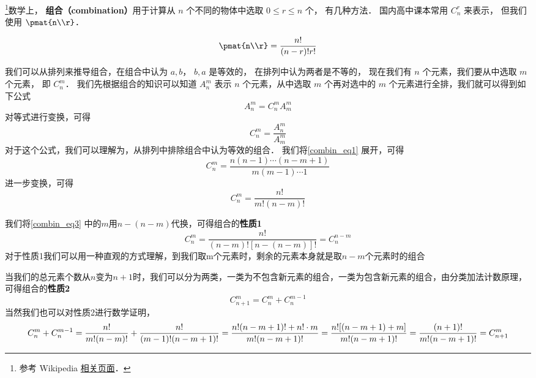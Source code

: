 
\begin{issues}
\issueDraft
\end{issues}


\footnote{参考 Wikipedia \href{https://en.wikipedia.org/wiki/Combination}{相关页面}．}数学上， \textbf{组合（combination）}用于计算从 $n$ 个不同的物体中选取 $0 \leqslant r \leqslant n$ 个， 有几种方法． 国内高中课本常用 $C_n^r$ 来表示， 但我们使用 $\pmat{n\\r}$．

\begin{equation}
\pmat{n\\r} = \frac{n!}{(n-r)!r!}
\end{equation}

我们可以从排列来推导组合，在组合中认为 ${a,b}$， ${b,a}$ 是等效的， 在排列中认为两者是不等的， 现在我们有 $n$ 个元素，我们要从中选取 $m$ 个元素， 即 $C_n^m$．
我们先根据组合的知识可以知道 $A_n^m$ 表示 $n$ 个元素，从中选取 $m$ 个再对选中的 $m$ 个元素进行全排，我们就可以得到如下公式
\begin{equation}
A_n^m = C_n^m A_m^m
\end{equation}
对等式进行变换，可得
\begin{equation}\label{combin_eq1}
C_n^m = \frac{A_n^m}{A_m^m}
\end{equation}
对于这个公式，我们可以理解为，从排列中排除组合中认为等效的组合．
我们将\autoref{combin_eq1} 展开，可得
\begin{equation}\label{combin_eq2}
C_n^m = \frac{n(n - 1) \cdots (n - m + 1)}{m(m-1)\cdots 1}
\end{equation}
进一步变换，可得
\begin{equation}\label{combin_eq3}
C_n^m = \frac{n!}{m!(n-m)!}
\end{equation}

我们将\autoref{combin_eq3} 中的$m$用$n-(n-m)$代换，可得组合的\textbf{性质1}
\begin{equation}
C_n^m = \frac{n!}{(n-m)![n-(n-m)]!} = C_n^{n-m}
\end{equation}
对于性质1我们可以用一种直观的方式理解，到我们取m个元素时，剩余的元素本身就是取$n-m$个元素时的组合

当我们的总元素个数从$n$变为$n+1$时，我们可以分为两类，一类为不包含新元素的组合，一类为包含新元素的组合，由分类加法计数原理，可得组合的\textbf{性质2}
\begin{equation}
C_{n + 1}^m = C_n^m + C_n^{m - 1}
\end{equation}
当然我们也可以对性质2进行数学证明，
\begin{equation}
C_n^m + C_n^{m - 1} = \frac{n!}{m!(n-m)!} + \frac{n!}{(m - 1)!(n - m + 1)!}\\
=\frac{n!(n - m + 1)! + n!\cdot m}{m!(n - m +1)!}\\ 
=\frac{n![(n - m + 1) + m]}{m!(n - m + 1)!}\\
=\frac{(n + 1)!}{m!(n - m + 1)!}=C_{n+1}^m
\end{equation}